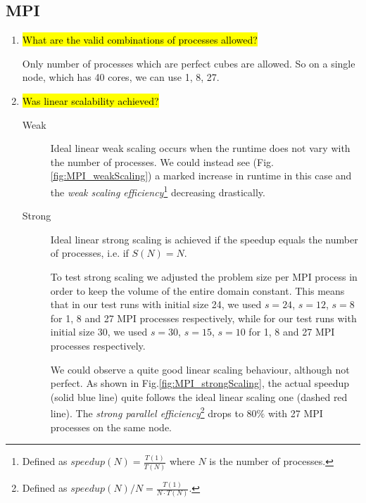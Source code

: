 \documentclass{article}
\begin{document}
\subsection{MPI}
\begin{enumerate}
	\item \hl{What are the valid combinations of processes allowed?}

	Only number of processes which are perfect cubes are allowed. So on a single node, which has 40 cores, we can use 1, 8, 27.
	

	\item \hl{Was linear scalability achieved?}


	\begin{description}
		\item[Weak]	 Ideal linear weak scaling occurs when the runtime does not vary with the number of processes. We could instead see (Fig.\ref{fig:MPI_weakScaling}) a marked increase in runtime in this case and the \emph{weak scaling efficiency}\footnote{Defined as $speedup(N) = \frac{T(1)}{T(N)}$ where $N$ is the number of processes.} decreasing drastically.

		\item[Strong]
		Ideal linear strong scaling is achieved if the speedup equals the number of processes, i.e. if $S(N) = N$.

		To test strong scaling we adjusted the problem size per MPI process in order to keep the volume of the entire domain constant. This means that in our test runs with initial size 24, we used $s=24$, $s=12$, $s=8$ for 1, 8 and 27 MPI processes respectively, while for our test runs with initial size 30, we used $s=30$, $s=15$, $s=10$ for 1, 8 and 27 MPI processes respectively.

		We could observe a quite good linear scaling behaviour, although not perfect. As shown in Fig.\ref{fig:MPI_strongScaling}, the actual speedup (solid blue line) quite follows the ideal linear scaling one (dashed red line). The \emph{strong parallel efficiency}\footnote{Defined as $speedup(N)/N = \frac{T(1)}{N \cdot T(N)}$.} drops to $80\%$ with 27 MPI processes on the same node.


\end{description}
\end{enumerate}
\end{document}

